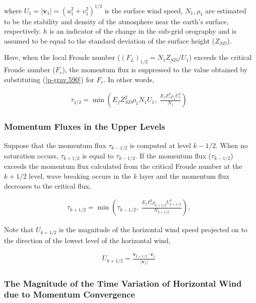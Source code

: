 where \(U_1 = |{\mathbf v}_1| = (u_1^2 + v_1^2)^{1/2}\) is the surface
wind speed, \(N_1, \rho_1\) are estimated to be the stability and
density of the atmosphere near the earth's surface, respectively. \(h\)
is an indicator of the change in the sub-grid orography and is assumed
to be equal to the standard deviation of the surface height
(\(Z_{SD}\)).

Here, when the local Froude number (\((F_L)_{1/2} = N_1 Z_{SD}/U_1\))
exceeds the critical Froude number (\(F_c\)), the momentum flux is
suppressed to the value obtained by substituting
(\ref{p-grav.590}) for \(F_c\). In other words,

\begin{eqnarray}
  \tau_{1/2} = \min \left(
                   E_f Z_{SD}^{2} \rho_1 N_1 U_1, \;
                  \frac{E_f F_c^{2} \rho_1 U_1^3}{N_1}
               \right)
\end{eqnarray}

\hypertarget{momentum-fluxes-in-the-upper-levels}{%
\subsubsection{Momentum Fluxes in the Upper
Levels}\label{momentum-fluxes-in-the-upper-levels}}

Suppose that the momentum flux \(\tau_{k-1/2}\) is computed at level
\(k-1/2\). When no saturation occurs, \(\tau_{k+1/2}\) is equal to
\(\tau_{k-1/2}\). If the momentum flux (\(\tau_{k-1/2}\)) exceeds the
momentum flux calculated from the critical Froude number at the
\(k+1/2\) level, wave breaking occurs in the \(k\) layer and the
momentum flux decreases to the critical flux.

\begin{eqnarray}
  \tau_{k+1/2} = \min \left(
               \tau_{k-1/2}, \;
               \frac{E_f F_c^2 \rho_{k+1/2} U_{k+1/2}^3}{N_{k+1/2}}
                      \right),
\end{eqnarray}

Note that \(U_{k+1/2}\) is the magnitude of the horizontal wind speed
projected on to the direction of the lowest level of the horizontal
wind,

\begin{eqnarray}
  U_{k+1/2} = \frac{{\mathbf v}_{k+1/2}
                      \cdot {\mathbf v}_{1}}
                   {|{\mathbf v}_{1}|       }
\end{eqnarray}

\hypertarget{the-magnitude-of-the-time-variation-of-horizontal-wind-due-to-momentum-convergence}{%
\subsubsection{The Magnitude of the Time Variation of Horizontal Wind
due to Momentum
Convergence}\label{the-magnitude-of-the-time-variation-of-horizontal-wind-due-to-momentum-convergence}}

